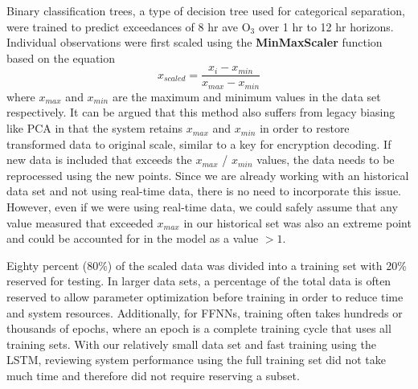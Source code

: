 Binary classification trees, a type of decision tree used for categorical separation,  were trained to predict exceedances of 8 hr ave O$_{3}$ over 1 hr to 12 hr horizons. Individual observations were first scaled using the \textbf{MinMaxScaler} function based on the equation
%
\begin{equation}
\label{eq:MaxMin}
x_{scaled} = \frac{x_{i} - x_{min}}{x_{max} - x_{min}}
\end{equation}
%
\noindent
where $x_{max}$ and $x_{min}$ are the maximum and minimum values in the data set respectively. It can be argued that this method also suffers from legacy biasing like PCA in that the system retains $x_{max}$ and $x_{min}$ in order to restore transformed data to original scale, similar to a key for encryption decoding. If new data is included that exceeds the $x_{max}$ / $x_{min}$ values, the data needs to be reprocessed using the new points. Since we are already working with an historical data set and not using real-time data, there is no need to incorporate this issue. However, even if we were using real-time data, we could safely assume that any value measured that exceeded $x_{max}$ in our historical set was also an extreme point and could be accounted for in the model as a value $>1$. 

Eighty percent (80\%) of the scaled data was divided into a training set with 20\% reserved for testing.  In larger data sets, a percentage of the total data is often reserved to allow parameter optimization before training in order to reduce time and system resources. Additionally, for FFNNs, training often takes hundreds or thousands of epochs, where an epoch is a complete training cycle that uses all training sets. With our relatively small data set and fast training using the LSTM, reviewing system performance using the full training set did not take much time and therefore did not require reserving a subset.

